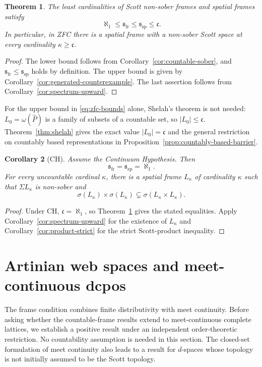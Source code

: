 \documentclass[11pt,reqno]{amsart}
\newtheorem{theorem}{Theorem}[section]
\newtheorem{corollary}[theorem]{Corollary}
\theoremstyle{definition}
\numberwithin{equation}{section}
\newcommand{\ssp}{\mathfrak{s}_{\mathrm{sp}}}
\newcommand{\sfr}{\mathfrak{s}_{\mathrm{fr}}}
\newcommand{\cc}{\mathfrak{c}}
\begin{document}
\begin{theorem}\label{thm:zfc-bounds}
The least cardinalities of Scott non-sober frames and spatial frames
satisfy
\begin{equation}\label{eq:zfc-bounds}
  \aleph_1\leq\sfr\leq\ssp\leq\cc.
\end{equation}
In particular, in ZFC there is a spatial frame with a non-sober Scott
space at every cardinality $\kappa\geq\cc$.
\end{theorem}

\begin{proof}
The lower bound follows from Corollary~\ref{cor:countable-sober}, and
$\sfr\leq\ssp$ holds by definition. The upper bound is given by
Corollary~\ref{cor:generated-counterexample}. The last assertion follows
from Corollary~\ref{cor:spectrum-upward}.
\end{proof}

For the upper bound in \eqref{eq:zfc-bounds} alone, Shelah's theorem is
not needed: $L_0=\omega(\widehat P)$ is a family of subsets of a countable
set, so $|L_0|\leq\cc$. Theorem~\ref{thm:shelah} gives the exact value
$|L_0|=\cc$ and the general restriction on countably based
representations in Proposition~\ref{prop:countably-based-barrier}.

\begin{corollary}[CH]\label{cor:ch}
Assume the Continuum Hypothesis. Then
\[
  \sfr=\ssp=\aleph_1.
\]
For every uncountable cardinal $\kappa$, there is a spatial frame
$L_\kappa$ of cardinality $\kappa$ such that $\Sigma L_\kappa$ is
non-sober and
\[
  \sigma(L_\kappa)\times\sigma(L_\kappa)
  \subsetneq\sigma(L_\kappa\times L_\kappa).
\]
\end{corollary}

\begin{proof}
Under CH, $\cc=\aleph_1$, so Theorem~\ref{thm:zfc-bounds} gives the stated
equalities. Apply Corollary~\ref{cor:spectrum-upward} for the existence
of $L_\kappa$ and Corollary~\ref{cor:product-strict} for the strict
Scott-product inequality.
\end{proof}

\section{Artinian web spaces and meet-continuous dcpos}\label{sec:artinian}

The frame condition combines finite distributivity with meet continuity.
Before asking whether the countable-frame results extend to
meet-continuous complete lattices, we establish a positive result under
an independent order-theoretic restriction. No countability assumption
is needed in this section. The closed-set formulation of meet continuity
also leads to a result for $d$-spaces whose topology is not initially
assumed to be the Scott topology.
\end{document}
